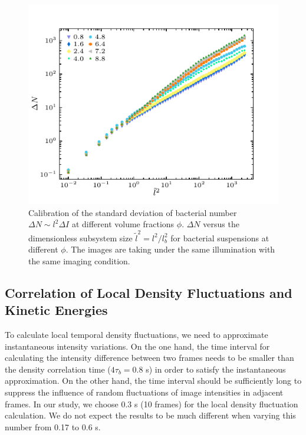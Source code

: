 \begin{figure}[ht]
  \begin{center}
    \includegraphics[width=4.5in]{Figs/5-GNF/GNF-normalization.pdf}
    \caption[Normalization of GNF at different volume fractions]
    {
    Calibration of the standard deviation of bacterial number $\Delta N \sim l^2\Delta I$ at different volume fractions $\phi$. $\Delta N$ versus the dimensionless subsystem size $\tilde{l}^2 = l^2/l_b^2$ for bacterial suspensions at different $\phi$. The images are taking under the same illumination with the same imaging condition.
    }
    \label{fig:same-conditions}
  \end{center}
\end{figure}

\subsection{Correlation of Local Density Fluctuations and Kinetic Energies}

To calculate local temporal density fluctuations, we need to approximate instantaneous intensity variations. On the one hand, the time interval for calculating the intensity difference between two frames needs to be smaller than the density correlation time ($4\tau_b = 0.8$ s) in order to satisfy the instantaneous approximation. On the other hand, the time interval should be sufficiently long to suppress the influence of random fluctuations of image intensities in adjacent frames. In our study, we choose 0.3 s (10 frames) for the local density fluctuation calculation. We do not expect the results to be much different when varying this number from 0.17 to 0.6 s.

